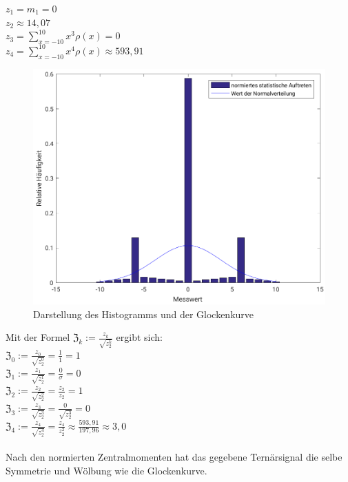 	$z_1 = m_1 = 0$\\
	$z_2 \approx 14,07$\\
	$z_3 = \sum_{x=-10}^{10} x^3\rho(x) =  0$\\
	$z_4 = \sum_{x=-10}^{10} x^4\rho(x) \approx  593,91$\\
	\newpage
	\begin{figure}
		\includegraphics[scale = 0.9]{A08_Histogramm.png}
		\caption{Darstellung des Histogramms und der Glockenkurve}
	\end{figure}
	Mit der Formel $\mathfrak{Z}_k := \frac{z_k}{\sqrt{z_2^k}}$ ergibt sich:\\
	$\mathfrak{Z}_0 := \frac{z_0}{\sqrt{z_2^0}} = \frac{1}{1} = 1$\\
	$\mathfrak{Z}_1 := \frac{z_1}{\sqrt{z_2^1}} = \frac{0}{\sigma} = 0$\\
	$\mathfrak{Z}_2 := \frac{z_2}{\sqrt{z_2^2}} = \frac{z_2}{z_2} = 1$\\
	$\mathfrak{Z}_3 := \frac{z_3}{\sqrt{z_2^3}} = \frac{0}{\sqrt{z_2^3}} = 0$\\
	$\mathfrak{Z}_4 := \frac{z_4}{\sqrt{z_2^4}} = \frac{z_4}{z_2^2} \approx \frac{593,91}{197,96} \approx 3,0$\\
	\\
	Nach den normierten Zentralmomenten hat das gegebene Ternärsignal die selbe Symmetrie und Wölbung wie die Glockenkurve.	
